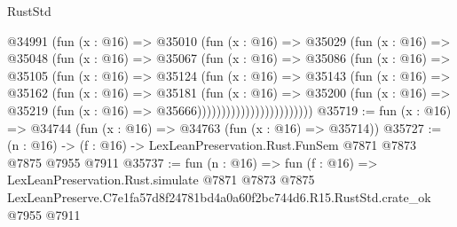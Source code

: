 \begin{lexlean}{RustStd}
\begin{coremodule}
                        @34991
                          (fun (x : @16) =>
                          @35010
                            (fun (x : @16) =>
                            @35029
                              (fun (x : @16) =>
                              @35048
                                (fun (x : @16) =>
                                @35067
                                  (fun (x : @16) =>
                                  @35086
                                    (fun (x : @16) =>
                                    @35105
                                      (fun (x : @16) =>
                                      @35124
                                        (fun (x : @16) =>
                                        @35143
                                          (fun (x : @16) =>
                                          @35162
                                            (fun (x : @16) =>
                                            @35181
                                              (fun (x : @16) =>
                                              @35200
                                                (fun (x : @16) =>
                                                @35219
                                                  (fun (x : @16) => @35666))))))))))))))))))))))))
@35719 := fun (x : @16) => @34744 (fun (x : @16) => @34763 (fun (x : @16) => @35714))
@35727 := (n : @16) -> (f : @16) -> LexLeanPreservation.Rust.FunSem @7871 @7873 @7875 @7955 @7911
@35737 := fun (n : @16) =>
  fun (f : @16) =>
  LexLeanPreservation.Rust.simulate
    @7871
    @7873
    @7875
    LexLeanPreserve.C7e1fa57d8f24781bd4a0a60f2bc744d6.R15.RustStd.crate_ok
    @7955
    @7911
\end{coremodule}
\end{lexlean}
